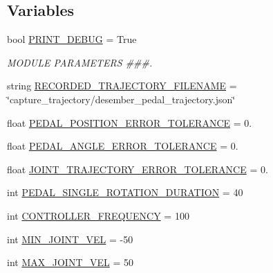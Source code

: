 \subsection*{Variables}
\begin{DoxyCompactItemize}
\item 
bool \mbox{\hyperlink{namespacepedal__simulation__old__trajectory_a2515890556ea5aae72b9e46b06bc56b8}{P\+R\+I\+N\+T\+\_\+\+D\+E\+B\+UG}} = True
\begin{DoxyCompactList}\small\item\em M\+O\+D\+U\+LE P\+A\+R\+A\+M\+E\+T\+E\+RS \#\#\#. \end{DoxyCompactList}\item 
string \mbox{\hyperlink{namespacepedal__simulation__old__trajectory_a5dbf7f24cab766d42e1c7b2d8c545753}{R\+E\+C\+O\+R\+D\+E\+D\+\_\+\+T\+R\+A\+J\+E\+C\+T\+O\+R\+Y\+\_\+\+F\+I\+L\+E\+N\+A\+ME}} = \char`\"{}capture\+\_\+trajectory/desember\+\_\+pedal\+\_\+trajectory.\+json\char`\"{}
\item 
float \mbox{\hyperlink{namespacepedal__simulation__old__trajectory_a01ab05f9a01686d6d0ef5961e705be90}{P\+E\+D\+A\+L\+\_\+\+P\+O\+S\+I\+T\+I\+O\+N\+\_\+\+E\+R\+R\+O\+R\+\_\+\+T\+O\+L\+E\+R\+A\+N\+CE}} = 0.
\item 
float \mbox{\hyperlink{namespacepedal__simulation__old__trajectory_a11268be37bee5ed3184decc8baf8178f}{P\+E\+D\+A\+L\+\_\+\+A\+N\+G\+L\+E\+\_\+\+E\+R\+R\+O\+R\+\_\+\+T\+O\+L\+E\+R\+A\+N\+CE}} = 0.
\item 
float \mbox{\hyperlink{namespacepedal__simulation__old__trajectory_a5fcfbf7879d96497ec40da6557c6afd2}{J\+O\+I\+N\+T\+\_\+\+T\+R\+A\+J\+E\+C\+T\+O\+R\+Y\+\_\+\+E\+R\+R\+O\+R\+\_\+\+T\+O\+L\+E\+R\+A\+N\+CE}} = 0.
\item 
int \mbox{\hyperlink{namespacepedal__simulation__old__trajectory_a83d735e9ef192d9b4783187e635d926f}{P\+E\+D\+A\+L\+\_\+\+S\+I\+N\+G\+L\+E\+\_\+\+R\+O\+T\+A\+T\+I\+O\+N\+\_\+\+D\+U\+R\+A\+T\+I\+ON}} = 40
\item 
int \mbox{\hyperlink{namespacepedal__simulation__old__trajectory_a9c663cd41668a040a5a1b26b65aca5c0}{C\+O\+N\+T\+R\+O\+L\+L\+E\+R\+\_\+\+F\+R\+E\+Q\+U\+E\+N\+CY}} = 100
\item 
int \mbox{\hyperlink{namespacepedal__simulation__old__trajectory_af10f4e1b8a13dac9ae0b44a6ee48e76f}{M\+I\+N\+\_\+\+J\+O\+I\+N\+T\+\_\+\+V\+EL}} = -\/50
\item 
int \mbox{\hyperlink{namespacepedal__simulation__old__trajectory_a4af3ede5fbdd5abbf4340c2371a6bfb3}{M\+A\+X\+\_\+\+J\+O\+I\+N\+T\+\_\+\+V\+EL}} = 50

\end{DoxyCompactItemize}
